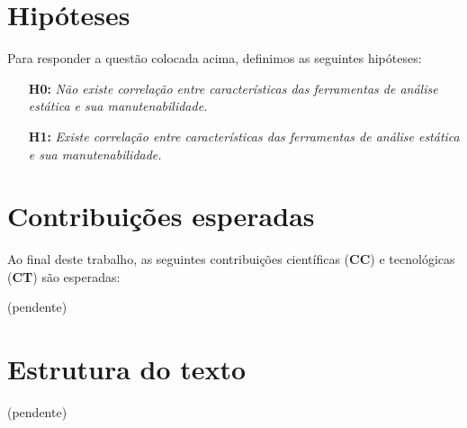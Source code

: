 \section{Hipóteses} \label{hipoteses}

Para responder a questão colocada acima, definimos as seguintes hipóteses:

\begin{enumerate}
  \item[{\bf H0:}] {\em Não existe correlação entre características das
  ferramentas de análise estática e sua manutenabilidade.}
  \item[{\bf H1:}] {\em Existe correlação entre características das ferramentas
  de análise estática e sua manutenabilidade.}
\end{enumerate}

\section{Contribuições esperadas}

Ao final deste trabalho, as seguintes contribuições científicas ({\bf CC}) e
tecnológicas ({\bf CT}) são esperadas:

(pendente)

%

\section{Estrutura do texto} 

(pendente)

